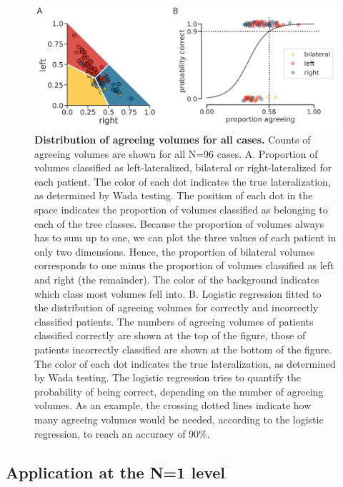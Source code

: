\documentclass[fleqn,10pt]{SelfArx} %
\begin{document}
\begin{figure}[htb]
	\begin{minipage}{\textwidth}
		\renewcommand{\familydefault}{\sfdefault}\normalfont
		\centering
		\includegraphics[width=0.95\columnwidth]{../reports/figures/15-space-and-log.png}
		\caption{\textbf{Distribution of agreeing volumes for all cases.} Counts of agreeing volumes are shown for all N=96 cases.
			A. Proportion of volumes classified as left-lateralized, bilateral or right-lateralized for each patient. The color of each dot indicates the true lateralization, as determined by Wada testing. The position of each dot in the space indicates the proportion of volumes classified as belonging to each of the tree classes. Because the proportion of volumes always has to sum up to one, we can plot the three values of each patient in only two dimensions. Hence, the proportion of bilateral volumes corresponds to one minus the proportion of volumes classified as left and right (the remainder). The color of the background indicates which class most volumes fell into.
			B. Logistic regression fitted to the distribution of agreeing volumes for correctly and incorrectly classified patients. The numbers of agreeing volumes of patients classified correctly are shown at the top of the figure, those of patients incorrectly classified are shown at the bottom of the figure. The color of each dot indicates the true lateralization, as determined by Wada testing. The logistic regression tries to quantify the probability of being correct, depending on the number of agreeing volumes. As an example, the crossing dotted lines indicate how many agreeing volumes would be needed, according to the logistic regression, to reach an accuracy of 90\%.}%
		\label{fig:log}
	\end{minipage}
\end{figure}


\subsection{Application at the N=1 level} \label{Application at the N=1 level}
\end{document}
